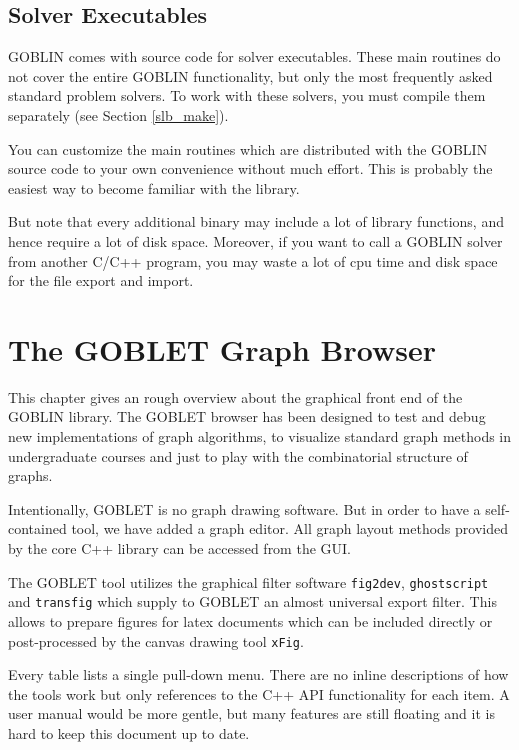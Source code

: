 \documentclass[a4paper,11pt,twoside]{book}
\begin{document}
\begin{multicols}{2}
\section{Solver Executables}

GOBLIN comes with source code for solver executables. These main routines do
not cover the entire GOBLIN functionality, but only the most frequently asked
standard problem solvers. To work with these solvers, you must compile them
separately (see Section \ref{slb_make}).

You can customize the main routines which are distributed with the GOBLIN
source code to your own convenience without much effort. This is probably the
easiest way to become familiar with the library.

But note that every additional binary may include a lot of library functions,
and hence require a lot of disk space. Moreover, if you want to call a GOBLIN
solver from another C/C++ program, you may waste a lot of cpu time and disk
space for the file export and import.


\cleardoublepage
{}
\chapter{The GOBLET Graph Browser}
\thispagestyle{fancy}

This chapter gives an rough overview about the graphical front end of the
GOBLIN library. The GOBLET browser has been designed to test and debug new
implementations of graph algorithms, to visualize standard graph methods in
undergraduate courses and just to play with the combinatorial structure of
graphs.

Intentionally, GOBLET is no graph drawing software. But in order to have a
self-contained tool, we have added a graph editor. All graph layout methods
provided by the core C++ library can be accessed from the GUI.

The GOBLET tool utilizes the graphical filter software \verb/fig2dev/,
\verb/ghostscript/ and \verb/transfig/ which supply to GOBLET an almost
universal export filter. This allows to prepare figures for latex documents
which can be included directly or post-processed by the canvas drawing tool
\verb/xFig/. 

Every table lists a single pull-down menu. There are no inline descriptions of
how the tools work but only references to the C++ API functionality for each
item. A user manual would be more gentle, but many features are still floating
and it is hard to keep this document up to date.


\end{multicols}
\end{document}

